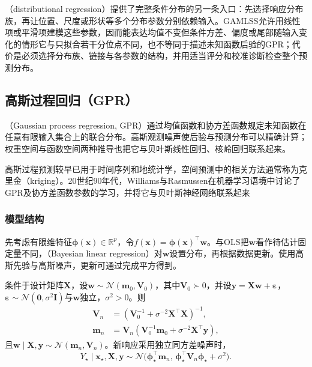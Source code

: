（distributional regression）提供了完整条件分布的另一条入口：先选择响应分布族，再让位置、尺度或形状等多个分布参数分别依赖输入。GAMLSS允许用线性项或平滑项建模这些参数，因而能表达均值不变但条件方差、偏度或尾部随输入变化的情形它与只拟合若干分位点不同，也不等同于描述未知函数后验的GPR；代价是必须选择分布族、链接与各参数的结构，并用适当评分和校准诊断检查整个预测分布。

\subsection{高斯过程回归（GPR）}
\label{sec:regression-gpr}

（Gaussian process regression, GPR）通过均值函数和协方差函数规定未知函数在任意有限输入集合上的联合分布。高斯观测噪声使后验与预测分布可以精确计算；权重空间与函数空间两种推导也把它与贝叶斯线性回归、核岭回归联系起来。

高斯过程预测较早已用于时间序列和地统计学，空间预测中的相关方法通常称为克里金（kriging）。20世纪90年代，Williams与Rasmussen在机器学习语境中讨论了GPR及协方差函数参数的学习，并将它与贝叶斯神经网络联系起来

\subsubsection{模型结构}
\label{sec:regression-gpr-structure}

先考虑有限维特征$\bm{\phi}(\bm{x})\in\mathbb{R}^{p}$，令$f(\bm{x})=\bm{\phi}(\bm{x})^{\top}\bm{w}$。与OLS把$\bm{w}$看作待估计固定量不同，（Bayesian linear regression）对$\bm{w}$设置分布，再根据数据更新。使用高斯先验与高斯噪声，更新可通过完成平方得到。

\begin{theorem}[贝叶斯线性回归的后验与预测]
  \label{thm:regression-bayesian-linear}
  条件于设计矩阵$\bm{X}$，设$\bm{w}\sim\mathcal{N}(\bm{m}_0,\bm{V}_0)$，其中$\bm{V}_0\succ0$，并设$\bm{y}=\bm{X}\bm{w}+\bm{\varepsilon}$，$\bm{\varepsilon}\sim\mathcal{N}(\bm{0},\sigma^2\bm{I})$与$\bm{w}$独立，$\sigma^2>0$。则
  \[
    \begin{aligned}
      \bm{V}_n&=(\bm{V}_0^{-1}+\sigma^{-2}\bm{X}^{\top}\bm{X})^{-1},\\
      \bm{m}_n&=\bm{V}_n
          (\bm{V}_0^{-1}\bm{m}_0+\sigma^{-2}\bm{X}^{\top}\bm{y}),
    \end{aligned}
  \]
  且$\bm{w}\mid\bm{X},\bm{y}\sim\mathcal{N}(\bm{m}_n,\bm{V}_n)$。新响应采用独立同方差噪声时，
  \[
    Y_{\star}\mid\bm{x}_{\star},\bm{X},\bm{y}
    \sim\mathcal{N}\bigl(
      \bm{\phi}_{\star}^{\top}\bm{m}_n,\,
      \bm{\phi}_{\star}^{\top}\bm{V}_n\bm{\phi}_{\star}+\sigma^2\bigr).
  \]
\end{theorem}

